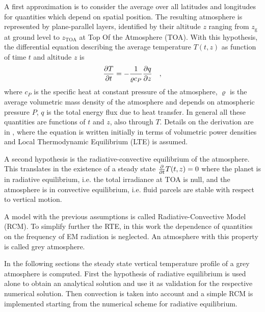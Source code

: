 \documentclass[a4paper,10pt,twocolumn,\classoptions]{article}
\newcommand{\zTOA}{z_\text{TOA}}
\begin{document}
A first approximation is to consider the average over all latitudes and longitudes for quantities which depend on spatial position. The resulting atmosphere is represented by plane-parallel layers, identified by their altitude $z$ ranging from $z_\text{g}$ at ground level to $\zTOA$ at Top Of the Atmosphere (TOA). With this hypothesis, the differential equation describing the average temperature $T(t,z)$ as function of time $t$ and altitude $z$ is
\begin{equation}
  \label{eq:temperature_derivation}
  \pdv{T}{t} = -\frac{1}{\varrho c_P} \pdv{q}{z}
  \quad ,
\end{equation}
where $c_P$ is the specific heat at constant pressure of the atmosphere, $\varrho$ is the average volumetric mass density of the atmosphere and depends on atmospheric pressure $P$, $q$ is the total energy flux due to heat transfer. In general all these quantities are functions of $t$ and $z$, also through $T$. Details on the derivation are in \cite[466]{Ramanathan}, where the equation is written initially in terms of volumetric power densities and Local Thermodynamic Equilibrium (LTE) is assumed.

A second hypothesis is the radiative-convective equilibrium of the atmosphere. This translates in the existence of a steady state $\pdv*{T(t,z)}{t} = 0$ where the planet is in radiative equilibrium, i.e. the total irradiance at TOA is null, and the atmosphere is in convective equilibrium, i.e. fluid parcels are stable with respect to vertical motion.

A model with the previous assumptions is called Radiative-Convective Model (RCM).
To simplify further the RTE, in this work the dependence of quantities on the frequency of EM radiation is neglected. An atmosphere with this property is called grey atmosphere.

In the following sections the steady state vertical temperature profile of a grey atmosphere is computed. First the hypothesis of radiative equilibrium is used alone to obtain an analytical solution and use it as validation for the respective numerical solution. Then convection is taken into account and a simple RCM is implemented starting from the numerical scheme for radiative equilibrium.
\end{document}
